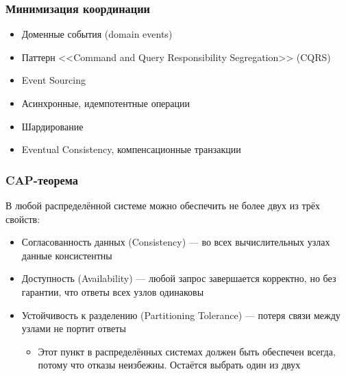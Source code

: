 \documentclass{../cscslides}
\begin{document}
    \begin{frame}
        \frametitle{Минимизация координации}
        \begin{itemize}
            \item Доменные события (domain events)
            \item Паттерн <<Command and Query Responsibility Segregation>> (CQRS)
            \item Event Sourcing
            \item Асинхронные, идемпотентные операции
            \item Шардирование
            \item Eventual Consistency, компенсационные транзакции
        \end{itemize}
    \end{frame}

    \begin{frame}
        \frametitle{CAP-теорема}
        В любой распределённой системе можно обеспечить не более двух из трёх свойств:
        \begin{itemize}
            \item Согласованность данных (Consistency) --- во всех вычислительных узлах данные консистентны
            \item Доступность (Availability) --- любой запрос завершается корректно, но без гарантии, что ответы всех узлов одинаковы
            \item Устойчивость к разделению (Partitioning Tolerance) --- потеря связи между узлами не портит ответы
            \begin{itemize}
                \item Этот пункт в распределённых системах должен быть обеспечен всегда, потому что отказы неизбежны. Остаётся выбрать один из двух
            \end{itemize}
        \end{itemize}
    \end{frame}
\end{document}
